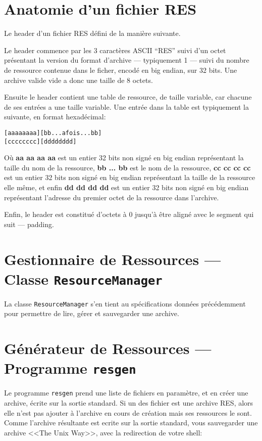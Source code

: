 \documentclass[11pt, a4paper, titlepage]{article}
\begin{document}
\section{Anatomie d'un fichier RES}

Le header d'un fichier RES défini de la manière suivante.

Le header commence par les 3 caractères ASCII ``RES'' suivi d'un octet
présentant la version du format d'archive --- typiquement 1 --- suivi
du nombre de ressource contenue dans le ficher, encodé en big endian,
sur 32 bits.  Une archive valide vide a donc une taille de 8 octets.

Ensuite le header contient une table de ressource, de taille variable,
car chacune de ses entrées a une taille variable.  Une entrée dans la
table est typiquement la suivante, en format hexadécimal:

\begin{alltt}
[ aa aa aa aa ] [ bb {... a fois ...} bb]
[ cc cc cc cc] [ dd dd dd dd ]
\end{alltt}

Où \textbf{aa aa aa aa} est un entier 32 bits non signé en big endian
représentant la taille du nom de la ressource, \textbf{bb ... bb} est
le nom de la ressource, \textbf{cc cc cc cc} est un entier 32 bits non
signé en big endian représentant la taille de la ressource elle même,
et enfin \textbf{dd dd dd dd} est un entier 32 bits non signé en big
endian représentant l'adresse du premier octet de la ressource dans
l'archive.

Enfin, le header est constitué d'octets à 0 jusqu'à être aligné avec
le segment qui suit --- padding.

\section{Gestionnaire de Ressources --- Classe
  \texttt{ResourceManager}}

La classe \texttt{ResourceManager} s'en tient au spécifications
données précédemment pour permettre de lire, gérer et sauvegarder une
archive.

\section{Générateur de Ressources --- Programme \texttt{resgen}}

Le programme \texttt{resgen} prend une liste de fichiers en paramètre,
et en créer une archive, écrite sur la sortie standard.  Si un des
fichier est une archive RES, alors elle n'est pas ajouter à l'archive
en cours de création mais ses ressources le sont.  Comme l'archive
résultante est ecrite sur la sortie standard, vous sauvegarder une
archive <<The Unix Way>>, avec la redirection de votre shell:
 
\end{document}
